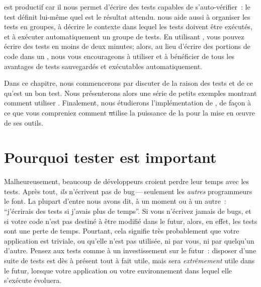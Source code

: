 \documentclass[a4paper,10pt,twoside]{book}
\begin{document}
\sunit est productif car il nous permet d'écrire des tests capables de s'auto-vérifier~: le test définit lui-même quel est le résultat attendu. \sunit nous aide aussi à organiser les tests en groupes, à décrire le contexte dans lequel les tests doivent être exécutés, et à exécuter automatiquement un groupe de tests. En utilisant \sunit, vous pouvez écrire des tests en moins de deux minutes; alors, au lieu d'écrire des portions de code dans un , nous vous encourageons à utiliser \sunit et à bénéficier de tous les avantages de tests sauvegardés et exécutables automatiquement.

Dans ce chapitre, nous commencerons par discuter de la raison des tests et de ce qu'est un bon test. 
Nous présenterons alors une série de petits exemples montrant comment utiliser \sunit. 
Finalement, nous étudierons l'implémentation de \sunit, de façon à ce que vous compreniez 
comment \st utilise la puissance de la  pour la mise en {\oe}uvre de ses outils.


\section{Pourquoi tester est important}

Malheureusement, beaucoup de développeurs croient perdre leur temps avec les tests. 
Après tout, \emph{ils} n'écrivent pas de bug\,---\,seulement les \emph{autres} programmeurs 
le font. La plupart d'entre nous avons dit, à un moment ou à un autre~: ``j'écrirais des tests 
si j'avais plus de temps''. Si vous n'écrivez jamais de bugs, et si votre code n'est pas 
destiné à être modifié dans le futur, alors, en effet, les tests sont une perte de temps. 
Pourtant, cela signifie très probablement que votre application est triviale, ou qu'elle 
n'est pas utilisée, ni par vous, ni par quelqu'un d'autre. Pensez aux tests comme à un 
investissement sur le futur~: disposer d'une suite de tests est dès à présent tout à fait 
utile, mais sera \emph{extrêmement} utile dans le futur, lorsque votre application ou votre 
environnement dans lequel elle s'exécute évoluera. 
\end{document}
